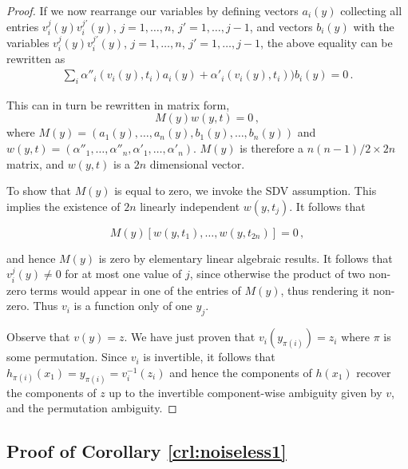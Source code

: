 \begin{proof}
	If we now rearrange our variables by defining vectors ${a}_i({y})$ collecting all entries $v_i^j({y})v_i^{j'}({y})$, $j=1, \ldots, n$, $j'=1, \ldots, j-1$, and vectors ${b}_i({y})$ with the variables $v_i^j({y})v_i^{j'}({y})$, $j=1, \ldots, n$, $j'=1, \ldots, j-1$, the above equality can be rewritten as
	\begin{align*}
	\sum_{i} \alpha''_{i}(v_{i}({y}), t_{i}){a}_i({y}) + \alpha'_{i}(v_{i}({y}),  t_{i})){b}_i({y})=0\,.
	\end{align*}
	
This can in turn be rewritten in matrix form,
	\[
	{M}({y}){w}({y}, {t})=0\,,
	\]
	where ${M}({y}) = ({a}_1({y}), \ldots,  {a}_n({y}), {b}_1({y}), \ldots, {b}_n({y})) $ and ${w}({y}, {t}) = (\alpha''_{1}, \ldots, \alpha''_{n}, \alpha'_{1}, \ldots,\alpha'_{n})$. ${M}({y})$ is therefore a $n(n-1)/2 \times 2n$ matrix, and ${w}({y}, {t})$ is a $2n$ dimensional vector.
	
	To show that ${M}({y})$ is equal to zero, we invoke the SDV assumption.
	This implies the existence of $2n$ linearly independent ${w}({y}, {t}_j)$.
	It follows that
	
	\[
	{M}({y})[{w}({y}, {t}_1), \ldots, {w}({y}, {t}_{2n})]=0\,,
	\]
	
	and hence ${M}({y})$ is zero by elementary linear algebraic results.
	It follows that $v_i^j({y})\not=0$ for at most one value of $j$, since otherwise the product of two non-zero terms would appear in one of the entries of ${M}({y})$, thus rendering it non-zero.
	Thus $v_i$ is a function only of one $y_j$.
	
	Observe that ${v}({y}) = {z}$.
	We have just proven that $v_i(y_{\pi(i)}) = z_i$ where $\pi$ is some permutation.
	Since $v_i$ is invertible, it follows that $h_{\pi(i)}({x}_{1}) = y_{\pi(i)} = v_i^{-1}(z_i)$ and hence the components of ${h}({x}_{1})$ recover the components of ${z}$ up to the invertible component-wise ambiguity given by ${v}$, and the permutation ambiguity.
	
\end{proof}

\subsection{Proof of Corollary \ref{crl:noiseless1}}\label{appendix:proof-cor2}

